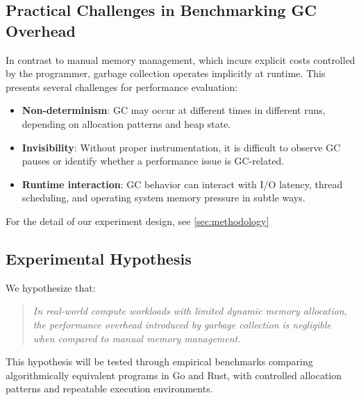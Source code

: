 \subsection{Practical Challenges in Benchmarking GC Overhead}

In contrast to manual memory management, which incurs explicit costs controlled by the programmer, garbage collection operates implicitly at runtime. This presents several challenges for performance evaluation:

\begin{itemize}
    \item \textbf{Non-determinism}: GC may occur at different times in different runs, depending on allocation patterns and heap state.
    \item \textbf{Invisibility}: Without proper instrumentation, it is difficult to observe GC pauses or identify whether a performance issue is GC-related.
    \item \textbf{Runtime interaction}: GC behavior can interact with I/O latency, thread scheduling, and operating system memory pressure in subtle ways.
\end{itemize}

For the detail of our experiment design, see \ref{sec:methodology}

\subsection{Experimental Hypothesis}

We hypothesize that:

\begin{quote}
    \emph{In real-world compute workloads with limited dynamic memory allocation, the performance overhead introduced by garbage collection is negligible when compared to manual memory management.}
\end{quote}

This hypothesis will be tested through empirical benchmarks comparing algorithmically equivalent programs in Go and Rust, with controlled allocation patterns and repeatable execution environments.